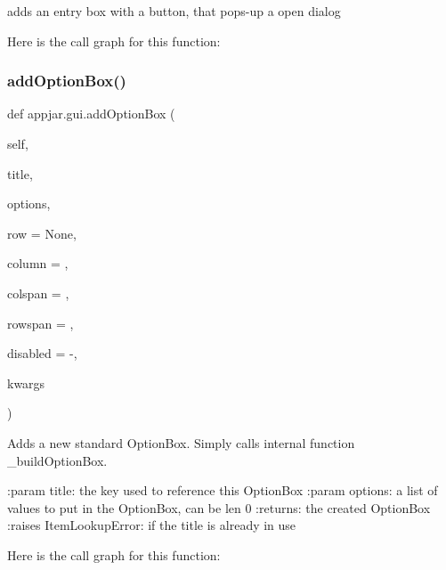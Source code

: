 \begin{DoxyVerb}adds an entry box with a button, that pops-up a open dialog \end{DoxyVerb}
 Here is the call graph for this function\+:
\mbox{\label{classappjar_1_1gui_ae354fdda13178fe687c65d4c5d0fa33d}} 
\subsubsection{\texorpdfstring{add\+Option\+Box()}{addOptionBox()}}
{\footnotesize\ttfamily def appjar.\+gui.\+add\+Option\+Box (\begin{DoxyParamCaption}\item[{}]{self,  }\item[{}]{title,  }\item[{}]{options,  }\item[{}]{row = {\ttfamily None},  }\item[{}]{column = {},  }\item[{}]{colspan = {},  }\item[{}]{rowspan = {},  }\item[{}]{disabled = {\ttfamily \textquotesingle{}-\/\textquotesingle{}},  }\item[{}]{kwargs }\end{DoxyParamCaption})}

\begin{DoxyVerb}Adds a new standard OptionBox.
Simply calls internal function _buildOptionBox.

:param title: the key used to reference this OptionBox
:param options: a list of values to put in the OptionBox, can be len 0
:returns: the created OptionBox
:raises ItemLookupError: if the title is already in use
\end{DoxyVerb}
 Here is the call graph for this function\+:
\mbox{\label{classappjar_1_1gui_ad765e15c5069624ba6d84871710880c8}} 
